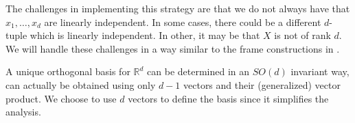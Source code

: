 \documentclass[twoside,11pt]{article}
\newcommand{\RR}{\mathbb{R}}
\newcommand{\CC}{\mathbb{C}}
\newcommand{\NN}{\mathbb{N}}
\renewcommand{\align}{\mathrm{align}}
\begin{document}
The challenges in implementing this strategy are that we do not always have that $x_1,\ldots,x_d$ are linearly independent. In some cases, there could be a different $d$-tuple which is linearly independent. In other, it may be that $X$ is not of rank $d$. We will handle these challenges in a way similar to the frame constructions in \cite{dym2024equivariant,pozdnyakov2023smooth}. 

\begin{remark}
A unique orthogonal basis for $\RR^d$ can be determined in an $SO(d)$ invariant way, can actually be obtained using only $d-1$ vectors and their (generalized) vector product. We choose to use $d$ vectors to define the basis since it simplifies the analysis. 
\end{remark}

% 

\end{document}
